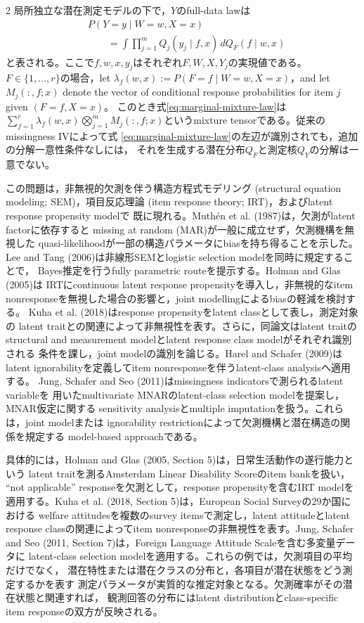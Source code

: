 \documentclass[a4paper,10pt]{article}
\begin{document}
\begin{multicols}{2}
局所独立な潜在測定モデルの下で，$Y$のfull-data lawは
\begin{equation}
\begin{aligned}
&P(Y=y\mid W=w,X=x)\\
&\qquad=\int\prod_{j=1}^m Q_j(y_j\mid f,x)\,
 dQ_F(f\mid w,x)
\end{aligned}
\label{eq:marginal-mixture-law}
\end{equation}
と表される。ここで$f,w,x,y_j$はそれぞれ$F,W,X,Y_j$の実現値である。
$F\in\{1,\ldots,r\}$の場合，let
$\lambda_f(w,x):=P(F=f\mid W=w,X=x)$，and let $M_j(:,f;x)$ denote the
vector of conditional response probabilities for item $j$ given $(F=f,X=x)$。
このとき式\eqref{eq:marginal-mixture-law}は
$\sum_{f=1}^r\lambda_f(w,x)\bigotimes_{j=1}^m M_j(:,f;x)$というmixture
tensorである。従来のmissingness IVによって式
\eqref{eq:marginal-mixture-law}の左辺が識別されても，追加の分解一意性条件なしには，
それを生成する潜在分布$Q_F$と測定核$Q_Y$の分解は一意でない。

この問題は，非無視的欠測を伴う構造方程式モデリング
(structural equation modeling; SEM)，項目反応理論
(item response theory; IRT)，およびlatent response propensity modelで
既に現れる。Muth\'en et al. (1987)は，欠測がlatent factorに依存すると
missing at random (MAR)が一般に成立せず，欠測機構を無視した
quasi-likelihoodが一部の構造パラメータにbiasを持ち得ることを示した。
Lee and Tang (2006)は非線形SEMとlogistic selection modelを同時に規定することで，
Bayes推定を行うfully parametric routeを提示する。Holman and Glas (2005)は
IRTにcontinuous latent response propensityを導入し，非無視的なitem
nonresponseを無視した場合の影響と，joint modellingによるbiasの軽減を検討する。
Kuha et al. (2018)はresponse propensityをlatent classとして表し，測定対象の
latent traitとの関連によって非無視性を表す。さらに，同論文はlatent traitの
structural and measurement modelとlatent response class modelがそれぞれ識別される
条件を課し，joint modelの識別を論じる。Harel and Schafer (2009)はlatent
ignorabilityを定義してitem nonresponseを伴うlatent-class analysisへ適用する。
Jung, Schafer and Seo (2011)はmissingness indicatorsで測られるlatent variableを
用いたmultivariate MNARのlatent-class selection modelを提案し，MNAR仮定に関する
sensitivity analysisとmultiple imputationを扱う。これらは，joint modelまたは
ignorability restrictionによって欠測機構と潜在構造の関係を規定する
model-based approachである。

具体的には，Holman and Glas (2005, Section 5)は，日常生活動作の遂行能力という
latent traitを測るAmsterdam Linear Disability Scoreのitem bankを扱い，
``not applicable'' responseを欠測として，response propensityを含むIRT modelを
適用する。Kuha et al. (2018, Section 5)は，European Social Surveyの29か国における
welfare attitudesを複数のsurvey itemsで測定し，latent attitudeとlatent response
classの関連によってitem nonresponseの非無視性を表す。Jung, Schafer and Seo
(2011, Section 7)は，Foreign Language Attitude Scaleを含む多変量データに
latent-class selection modelを適用する。これらの例では，欠測項目の平均だけでなく，
潜在特性または潜在クラスの分布と，各項目が潜在状態をどう測定するかを表す
測定パラメータが実質的な推定対象となる。欠測確率がその潜在状態と関連すれば，
観測回答の分布にはlatent distributionとclass-specific item responseの双方が反映される。


\end{multicols}
\end{document}
